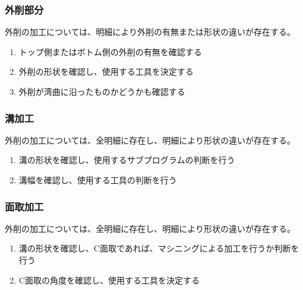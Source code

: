 \subsubsection{外削部分}
外削の加工については、明細により外削の有無または形状の違いが存在する。
\begin{enumerate}
\item トップ側またはボトム側の外削の有無を確認する
\item 外削の形状を確認し、使用する工具を決定する
\item {}外削が湾曲に沿ったものかどうかも確認する
\end{enumerate}

\subsubsection{溝加工}
外削の加工については、全明細に存在し、明細により形状の違いが存在する。
\begin{enumerate}
\item 溝の形状を確認し、使用するサブプログラムの判断を行う
\item {}溝幅を確認し、使用する工具の判断を行う
\end{enumerate}

\subsubsection{面取加工}
外削の加工については、全明細に存在し、明細により形状の違いが存在する。
\begin{enumerate}
\item 溝の形状を確認し、C面取であれば、マシニングによる加工を行うか判断を行う
\item {}C面取の角度を確認し、使用する工具を決定する
\end{enumerate}

\clearpage
